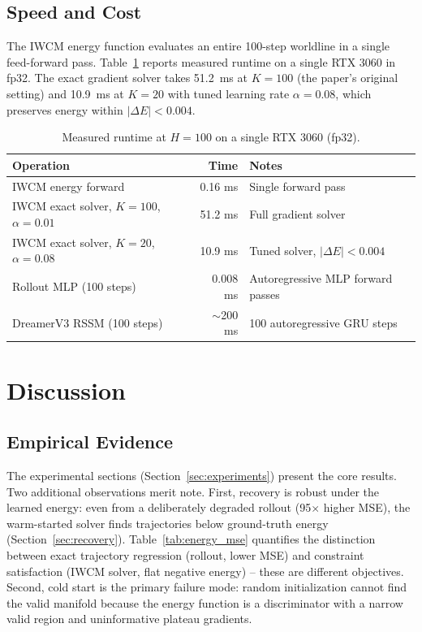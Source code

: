 \documentclass[12pt]{article}
\begin{document}
\subsection{Speed and Cost}
\label{sec:speed}

The IWCM energy function evaluates an entire 100-step worldline in a single feed-forward pass. Table~\ref{tab:speed} reports measured runtime on a single RTX 3060 in fp32. The exact gradient solver takes 51.2~ms at $K=100$ (the paper's original setting) and 10.9~ms at $K=20$ with tuned learning rate $\alpha=0.08$, which preserves energy within $|\Delta E| < 0.004$.

\begin{table}[h]
\centering
\caption{Measured runtime at $H=100$ on a single RTX 3060 (fp32).}
\label{tab:speed}
\small
\begin{tabular}{@{}lrl@{}}
\toprule
Operation & Time & Notes \\
\midrule
IWCM energy forward & 0.16 ms & Single forward pass \\
IWCM exact solver, $K=100$, $\alpha=0.01$ & 51.2 ms & Full gradient solver \\
IWCM exact solver, $K=20$, $\alpha=0.08$ & 10.9 ms & Tuned solver, $|\Delta E| < 0.004$ \\
Rollout MLP (100 steps) & 0.008 ms & Autoregressive MLP forward passes \\
DreamerV3 RSSM (100 steps) & $\sim$200 ms & 100 autoregressive GRU steps \\
\bottomrule
\end{tabular}
\end{table}

\section{Discussion}
\label{sec:discussion}

\subsection{Empirical Evidence}

The experimental sections (Section~\ref{sec:experiments}) present the core results. Two additional observations merit note. First, recovery is robust under the learned energy: even from a deliberately degraded rollout (95$\times$ higher MSE), the warm-started solver finds trajectories below ground-truth energy (Section~\ref{sec:recovery}). Table~\ref{tab:energy_mse} quantifies the distinction between exact trajectory regression (rollout, lower MSE) and constraint satisfaction (IWCM solver, flat negative energy) -- these are different objectives. Second, cold start is the primary failure mode: random initialization cannot find the valid manifold because the energy function is a discriminator with a narrow valid region and uninformative plateau gradients.
\end{document}

